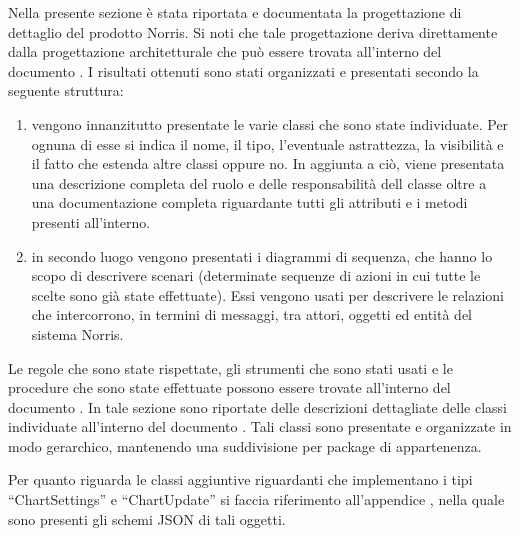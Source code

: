 	Nella presente sezione è stata riportata e documentata la progettazione di dettaglio del prodotto Norris. Si noti che tale progettazione deriva direttamente dalla progettazione architetturale che può essere trovata all'interno del documento . I risultati ottenuti sono stati organizzati e presentati secondo la seguente struttura:
	\begin{enumerate}
		\item vengono innanzitutto presentate le varie classi che sono state individuate. Per ognuna di esse si indica il nome, il tipo, l'eventuale astrattezza, la visibilità e il fatto che estenda altre classi oppure no. In aggiunta a ciò, viene presentata una descrizione completa del ruolo e delle responsabilità dell classe oltre a una documentazione completa riguardante tutti gli attributi e i metodi presenti all'interno.
		\item in secondo luogo vengono presentati i diagrammi di sequenza, che hanno lo scopo di descrivere scenari (determinate sequenze di azioni in cui tutte le scelte sono già state effettuate). Essi vengono usati per descrivere le relazioni che intercorrono, in termini di messaggi, tra attori, oggetti ed entità del sistema Norris.
	\end{enumerate}
	Le regole che sono state rispettate, gli strumenti che sono stati usati e le procedure che sono state effettuate possono essere trovate all'interno del documento .
    	In tale sezione sono riportate delle descrizioni dettagliate delle classi individuate all'interno del documento . Tali classi sono presentate e organizzate in modo gerarchico, mantenendo una suddivisione per package di appartenenza.
        

        Per quanto riguarda le classi aggiuntive riguardanti che implementano i tipi “ChartSettings” e “ChartUpdate” si faccia riferimento all'appendice , nella quale sono presenti gli schemi JSON di tali oggetti.
        


